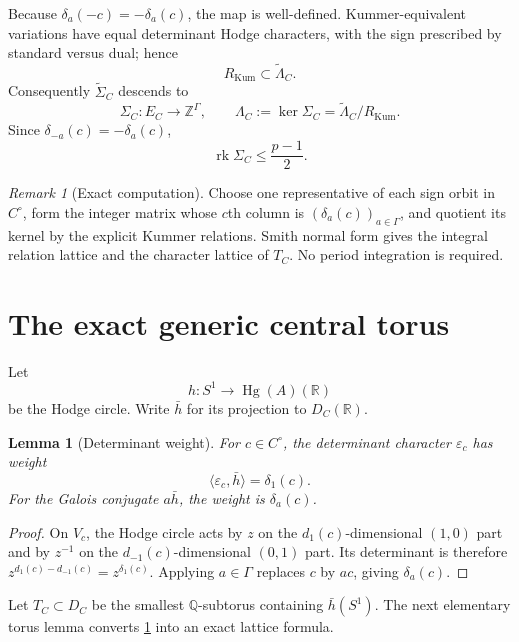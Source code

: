 \documentclass[11pt]{article}
\newtheorem{lemma}[theorem]{Lemma}
\theoremstyle{definition}
\theoremstyle{remark}
\newtheorem{remark}[theorem]{Remark}
\newcommand{\Q}{\mathbb Q}
\newcommand{\Z}{\mathbb Z}
\newcommand{\R}{\mathbb R}
\newcommand{\Hg}{\operatorname{Hg}}
\newcommand{\eps}{\varepsilon}
\newcommand{\rk}{\operatorname{rk}}
\begin{document}
Because $\delta_a(-c)=-\delta_a(c)$, the map is well-defined.  Kummer-equivalent variations have equal determinant Hodge characters, with the sign prescribed by standard versus dual; hence
\begin{equation}\label{eq:R-in-Lambda}
 R_{\mathrm{Kum}}\subset\widetilde\Lambda_C.
\end{equation}
Consequently $\widetilde\Sigma_C$ descends to
\begin{equation}\label{eq:Sigma}
 \Sigma_C:E_C\longrightarrow\Z^{\Gamma},
 \qquad
 \Lambda_C:=\ker\Sigma_C=
 \widetilde\Lambda_C/R_{\mathrm{Kum}}.
\end{equation}
Since $\delta_{-a}(c)=-\delta_a(c)$,
\begin{equation}\label{eq:rank-bound}
 \rk\Sigma_C\le\frac{p-1}{2}.
\end{equation}

\begin{remark}[Exact computation]
Choose one representative of each sign orbit in $C^\circ$, form the integer matrix whose $c$th column is $(\delta_a(c))_{a\in\Gamma}$, and quotient its kernel by the explicit Kummer relations.  Smith normal form gives the integral relation lattice and the character lattice of $T_C$.  No period integration is required.
\end{remark}

\section{The exact generic central torus}\label{sec:center}

Let
\[
 h:S^1\longrightarrow\Hg(A)(\R)
\]
be the Hodge circle.  Write $\bar h$ for its projection to $D_C(\R)$.

\begin{lemma}[Determinant weight]\label{lem:det-weight}
For $c\in C^\circ$, the determinant character $\eps_c$ has weight
\[
 \langle\eps_c,\bar h\rangle=\delta_1(c).
\]
For the Galois conjugate $a\bar h$, the weight is $\delta_a(c)$.
\end{lemma}

\begin{proof}
On $V_c$, the Hodge circle acts by $z$ on the $d_1(c)$-dimensional $(1,0)$ part and by $z^{-1}$ on the $d_{-1}(c)$-dimensional $(0,1)$ part.  Its determinant is therefore $z^{d_1(c)-d_{-1}(c)}=z^{\delta_1(c)}$.  Applying $a\in\Gamma$ replaces $c$ by $ac$, giving $\delta_a(c)$.
\end{proof}

Let $T_C\subset D_C$ be the smallest $\Q$-subtorus containing $\bar h(S^1)$.  The next elementary torus lemma converts \cref{lem:det-weight} into an exact lattice formula.
\end{document}
